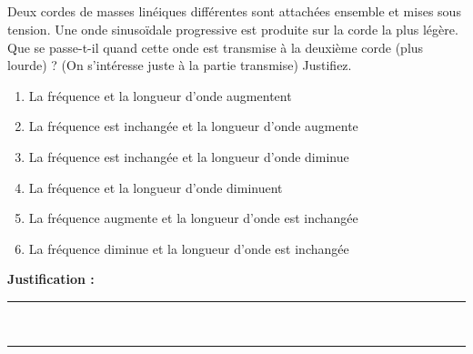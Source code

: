 \subsection{}
Deux cordes de masses linéiques différentes sont attachées ensemble et mises sous tension. Une onde sinusoïdale progressive est produite sur la corde la plus légère. Que se passe-t-il quand cette onde est transmise à la deuxième corde (plus lourde) ? (On s'intéresse juste à la partie transmise) Justifiez.

\begin{enumerate}[label=\Alph*)]
    \item La fréquence et la longueur d'onde augmentent
    \item La fréquence est inchangée et la longueur d'onde augmente
    \item La fréquence est inchangée et la longueur d'onde diminue
    \item La fréquence et la longueur d'onde diminuent
    \item La fréquence augmente et la longueur d'onde est inchangée
    \item La fréquence diminue et la longueur d'onde est inchangée
\end{enumerate}

\noindent\textbf{Justification :} \hrulefill \\[2.5ex]
\rule{\linewidth}{0.4pt} \\[2.5ex]
\rule{\linewidth}{0.4pt}
\vfill